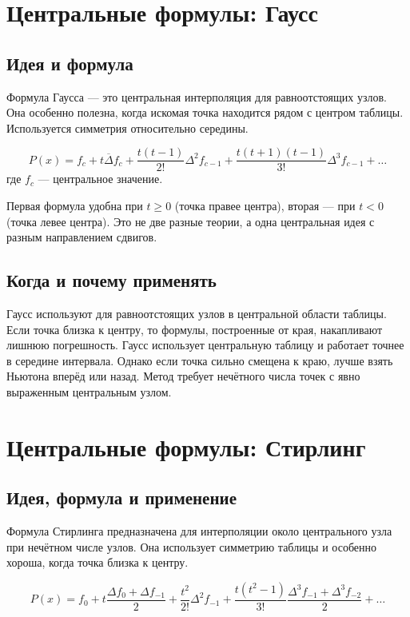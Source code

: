 \documentclass[12pt,a4paper]{article}
\begin{document}
\section{Центральные формулы: Гаусс}
\subsection{Идея и формула}

Формула Гаусса --- это центральная интерполяция для равноотстоящих узлов. Она особенно полезна, когда искомая точка находится рядом с центром таблицы. Используется симметрия относительно середины.

\begin{formbox}
\[
P(x)=f_c+t\overline{\Delta}f_c+\frac{t(t-1)}{2!}\Delta^2 f_{c-1}+\frac{t(t+1)(t-1)}{3!}\Delta^3 f_{c-1}+\dots
\]
где $f_c$ --- центральное значение.
\end{formbox}

Первая формула удобна при $t\ge0$ (точка правее центра), вторая --- при $t<0$ (точка левее центра). Это не две разные теории, а одна центральная идея с разным направлением сдвигов.

\subsection{Когда и почему применять}

Гаусс используют для равноотстоящих узлов в центральной области таблицы. Если точка близка к центру, то формулы, построенные от края, накапливают лишнюю погрешность. Гаусс использует центральную таблицу и работает точнее в середине интервала. Однако если точка сильно смещена к краю, лучше взять Ньютона вперёд или назад. Метод требует нечётного числа точек с явно выраженным центральным узлом.

\section{Центральные формулы: Стирлинг}
\subsection{Идея, формула и применение}

Формула Стирлинга предназначена для интерполяции около центрального узла при нечётном числе узлов. Она использует симметрию таблицы и особенно хороша, когда точка близка к центру.

\begin{formbox}
\[
P(x)=f_0+t\frac{\Delta f_0+\Delta f_{-1}}{2}+\frac{t^2}{2!}\Delta^2 f_{-1}+\frac{t(t^2-1)}{3!}\frac{\Delta^3 f_{-1}+\Delta^3 f_{-2}}{2}+\dots
\]
\end{formbox}
\end{document}
